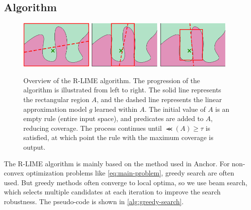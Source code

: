\documentclass[runningheads]{llncs}
\begin{document}
\subsection{Algorithm}
{%
  \begin{figure}[t]
    \centering
    \includegraphics[width=0.32\textwidth]{src/img/visual-rlime1}
    \includegraphics[width=0.32\textwidth]{src/img/visual-rlime2}
    \includegraphics[width=0.32\textwidth]{src/img/visual-rlime3}
    \caption[Overview of the R-LIME algorithm]{%
      Overview of the R-LIME algorithm.
      The progression of the algorithm is illustrated from left to right.
      The solid line represents the rectangular region $A$,
      and the dashed line represents the linear approximation model $g$
      learned within $A$.
      The initial value of $A$ is an empty rule (entire input space),
      and predicates are added to $A$, reducing coverage.
      The process continues until $\Prec(A)\ge\tau$ is satisfied,
      at which point the rule with the maximum coverage is output.
    }
  \end{figure}
  \def\myidt{\hspace{\algorithmicindent}}
  \begin{algorithm}[p]
    \small
    
  \end{algorithm}

  \begin{algorithm}[p]
    \small
    
  \end{algorithm}

  \begin{algorithm}[p]
    \small
    
  \end{algorithm}

  \begin{algorithm}[p]
    \small
    
  \end{algorithm}
}
The R-LIME algorithm
is mainly based on the method used in Anchor\cite{ribeiro2018anchors}.
For non-convex optimization problems like \cref{eq:main-problem},
greedy search are often used.
But greedy methods often converge to local optima,
so we use beam search, which selects multiple candidates at each iteration
to improve the search robustness.
The pseudo-code is shown in \cref{alg:greedy-search}.
\end{document}
